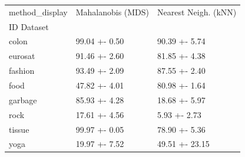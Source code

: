 \begin{tabular}{lll}
\toprule
method_display & Mahalanobis (MDS) & Nearest Neigh. (kNN) \\
ID Dataset &  &  \\
\midrule
colon & 99.04 +- 0.50 & 90.39 +- 5.74 \\
eurosat & 91.46 +- 2.60 & 81.85 +- 4.38 \\
fashion & 93.49 +- 2.09 & 87.55 +- 2.40 \\
food & 47.82 +- 4.01 & 80.98 +- 1.64 \\
garbage & 85.93 +- 4.28 & 18.68 +- 5.97 \\
rock & 17.61 +- 4.56 & 5.93 +- 2.73 \\
tissue & 99.97 +- 0.05 & 78.90 +- 5.36 \\
yoga & 19.97 +- 7.52 & 49.51 +- 23.15 \\
\bottomrule
\end{tabular}
